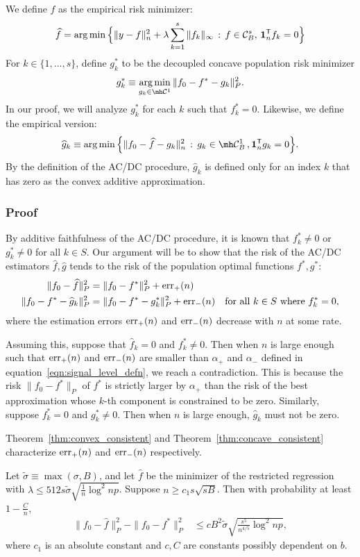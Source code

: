 We define $\hat{f}$ as the empirical risk minimizer:
\[
\widehat{f} = \arg\min \Big \{ \| y - f \|_n^2 + \lambda \sum_{k=1}^s \| f_k \|_\infty 
    \,:\, f \in \mathcal{C}^s_B,\, \mbox{\boldmath $1$}_n^{\mathsf{T}} f_k = 0 \Big \}
\]
For $k \in \{1,...,s\}$, define $g^*_k$ to be the decoupled concave population risk minimizer
\[
g^*_k \equiv \argmin_{g_k \in \mh \mathcal{C}^1} \| f_0 - f^* - g_k \|_P^2 .
\]
In our proof, we will analyze $g^*_k$ for each $k$ such that $f^*_k = 0$. Likewise, we define the empirical version:
\[
\hat{g}_k \equiv \argmin \Big\{ \| f_0 - \hat{f} - g_k \|_n^2 \,:\, g_k \in \mh \mathcal{C}^1_B \,, \mathbf{1}_n^\tran g_k = 0 \Big\}.
\]
By the definition of the AC/DC procedure, $\hat{g}_k$ is defined only
for an index $k$ that has zero as the convex additive approximation.


\subsubsection{Proof}
 
By additive faithfulness of the AC/DC procedure, it is known that $f^*_k \neq 0$ or $g^*_k \neq 0$ for all $k \in S$. 
Our argument will be to show that the risk of the AC/DC estimators $\hat{f}, \hat{g}$ tends to the risk of the population optimal functions $f^*, g^*$:
\begin{align*}
\| f_0 - \widehat{f} \|^2_P & = \| f_0 - f^* \|^2_P + \textrm{err}_+(n) \\
\| f_0 - f^* - \widehat{g}_k \|^2_P &=  \| f_0 - f^* - g^*_k \|^2_P + \textrm{err}_-(n) 
       \quad \textrm{for all $k \in S$ where $f^*_k = 0$},
\end{align*}
where the estimation errors $\textrm{err}_+(n)$ and $\textrm{err}_-(n)$ decrease with $n$ at some rate. 

Assuming this, suppose that $\hat{f}_k = 0$ and $f^*_k \neq 0$. Then when $n$ is large
enough such that $\textrm{err}_+(n)$ and $\textrm{err}_-(n)$ are smaller
than $\alpha_+$ and $\alpha_-$ defined in
equation~\eqref{eqn:signal_level_defn}, we reach a contradiction.
This is because the risk $\| f_0 - f^* \|_P$ of $f^*$ is
strictly larger by $\alpha_+$ than the risk of the best approximation
whose $k$-th component is constrained to be zero.
Similarly, suppose $f^*_k = 0$ and $g^*_k \neq 0$. Then when $n$ is large
enough, $\hat{g}_k$ must not be zero.

Theorem~\ref{thm:convex_consistent} and
Theorem~\ref{thm:concave_consistent} characterize $\textrm{err}_+(n)$ and
$\textrm{err}_-(n)$ respectively.

\begin{theorem}
\label{thm:convex_consistent}
Let $\tilde{\sigma} \equiv \max(\sigma, B)$, and let $\hat{f}$ be the
minimizer of the restricted regression with $\lambda \leq 512 s
\tilde{\sigma} \sqrt{ \frac{1}{n} \log^2 np}$.
Suppose $n \geq c_1 s \sqrt{sB}$.
Then with probability at least $1-\frac{C}{n}$,
\begin{align}
\|f_0 - \hat{f} \|_P^2 - \| f_0 - f^* \|_P^2 
&\leq c B^2 \tilde{\sigma} \sqrt{ \frac{s^5}{n^{4/5}} \log^2 np},
\end{align}
where $c_1$ is an absolute constant and $c, C$ are constants possibly dependent on $b$.
\end{theorem}


